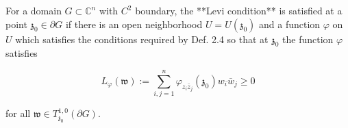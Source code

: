For a domain $G \subset \mathbb{C}^n$ with $C^2$ boundary, the **Levi condition** is satisfied at a point $\mathfrak{z}_0 \in \partial G$ if there is an open neighborhood $U = U(\mathfrak{z}_0)$ and a function $\varphi$ on $U$ which satisfies the conditions required by Def. 2.4 so that at $\mathfrak{z}_0$ the function $\varphi$ satisfies

$$L_{\varphi}(\mathfrak{w}) := \sum_{i,j=1}^{n} \varphi_{z_i \bar{z}_j}(\mathfrak{z}_0) w_i \bar{w}_j \geq 0$$

for all $\mathfrak{w} \in T_{\mathfrak{z}_0}^{1,0}(\partial G)$.
